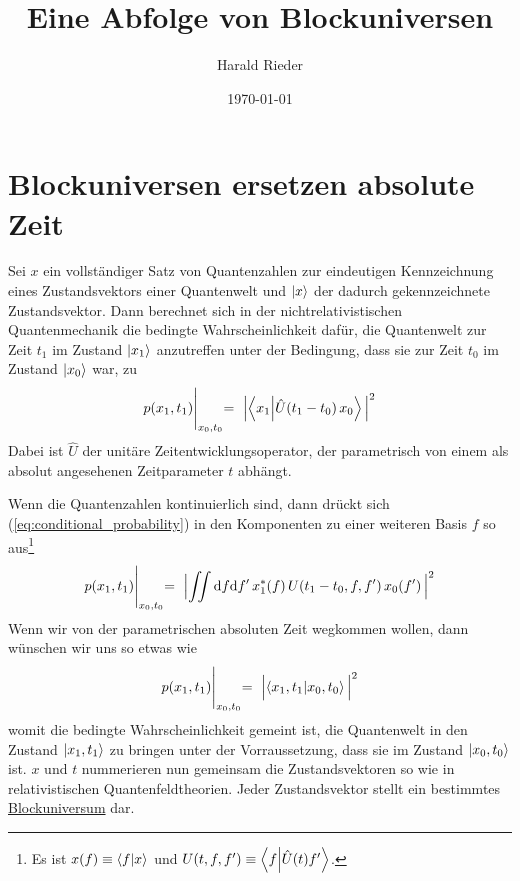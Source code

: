 \documentclass[12pt]{article}
\begin{document}
\title{\fontsize{25}{25}\selectfont \textbf{Eine Abfolge von Blockuniversen}}
\author{Harald Rieder}
\date{\today}
\maketitle



\tableofcontents

\section{Blockuniversen ersetzen absolute Zeit}
Sei $x$ ein vollständiger Satz von Quantenzahlen zur eindeutigen Kennzeichnung eines Zustandsvektors einer Quantenwelt und $\ket{x}$ der dadurch gekennzeichnete Zustandsvektor. Dann berechnet sich in der nichtrelativistischen Quantenmechanik die bedingte Wahrscheinlichkeit dafür, die Quantenwelt zur Zeit $t_1$ im Zustand $\ket{x_1}$ anzutreffen unter der Bedingung, dass sie zur Zeit $t_0$ im Zustand  $\ket{x_0}$ war, zu
\begin{equation} 
\label{eq:conditional_probability}
p(x_1,t_1)\Biggl|_{x_0,t_0} =\ \Bigl| \bra{x_1}\ket{\hat{U}(t_1-t_0)\,x_0} \Bigl|^2
\end{equation}
Dabei ist $\hat{U}$ der unitäre Zeitentwicklungsoperator, der parametrisch von einem als absolut angesehenen Zeitparameter $t$ abhängt. 

Wenn die Quantenzahlen kontinuierlich sind, dann drückt sich (\ref{eq:conditional_probability}) in den Komponenten zu einer weiteren Basis $f$ so aus\footnote{Es ist $x(f) \equiv \bra{f}\ket{x}$ und $U(t,f,f') \equiv \bra{f}\ket{\hat{U}(t)f'}$.}
\begin{equation} 
\label{eq:conditional_probability_components}
p(x_1,t_1) \Biggl|_{x_0,t_0}
=\ \Bigl| \iint \mathrm{d}f\mathrm{d}f'\, x_1^*(f)\, U(t_1-t_0,f,f')\, x_0(f')\, \Bigl|^2
\end{equation}
Wenn wir von der parametrischen absoluten Zeit wegkommen wollen, dann wünschen wir uns so etwas wie
\begin{equation} 
\label{eq:conditional_probability_relat}
p(x_1,t_1)\Biggl|_{x_0,t_0} =\ \Bigl| \bra{x_1,t_1}\ket{x_0,t_0} \Bigl|^2
\end{equation}
womit die bedingte Wahrscheinlichkeit gemeint ist, die Quantenwelt in den Zustand $\ket{x_1,t_1}$ zu bringen unter der Vorraussetzung, dass sie im Zustand $\ket{x_0,t_0}$ ist.  $x$ und $t$ nummerieren nun gemeinsam die Zustandsvektoren so wie in relativistischen Quantenfeldtheorien. Jeder Zustandsvektor stellt ein bestimmtes \href{https://de.wikipedia.org/wiki/Blockuniversum}{Blockuniversum} dar.
\end{document}
